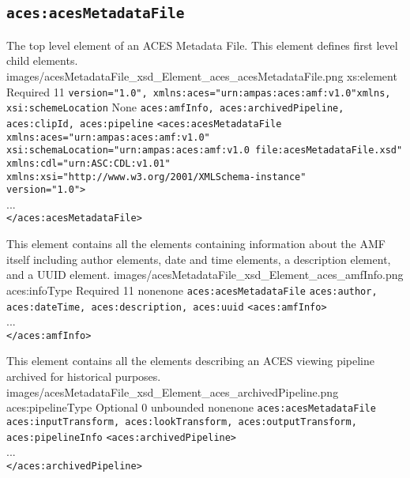 \subsection{\texttt{aces:acesMetadataFile}}

        {The top level element of an ACES Metadata File.  This element defines first level child elements.}
        {images/acesMetadataFile_xsd_Element_aces_acesMetadataFile.png}
        {xs:element}
        {Required}
        {1}{1}
        {\texttt{version="1.0", xmlns:aces="urn:ampas:aces:amf:v1.0"}}{\texttt{xmlns, xsi:schemeLocation}}
        {None}
        {\texttt{aces:amfInfo, aces:archivedPipeline, aces:clipId, aces:pipeline}}
        { \lstinline{<aces:acesMetadataFile} \\
        \lstinline{xmlns:aces="urn:ampas:aces:amf:v1.0"} \\
        \lstinline{xsi:schemaLocation="urn:ampas:aces:amf:v1.0 file:acesMetadataFile.xsd"} \\ \lstinline{xmlns:cdl="urn:ASC:CDL:v1.01"}\\
        \lstinline{xmlns:xsi="http://www.w3.org/2001/XMLSchema-instance"}\\
        \lstinline{version="1.0">}\\
        ... \\
        \lstinline{</aces:acesMetadataFile>}}

        {This element contains all the elements containing information about the AMF itself including author elements, date and time elements, a description element, and a UUID element.}
        {images/acesMetadataFile_xsd_Element_aces_amfInfo.png}
        {aces:infoType}
        {Required}
        {1}{1}
        {none}{none}
        {\texttt{aces:acesMetadataFile}}
        {\texttt{aces:author, aces:dateTime, aces:description, aces:uuid}}
        {\lstinline{<aces:amfInfo>} \\
        ... \\
        \lstinline{</aces:amfInfo>}}

        {This element contains all the elements describing an ACES viewing pipeline archived for historical purposes.}
        {images/acesMetadataFile_xsd_Element_aces_archivedPipeline.png}
        {aces:pipelineType}
        {Optional}
        {0}
        {unbounded}
        {none}{none}
        {\texttt{aces:acesMetadataFile}}
        {\texttt{aces:inputTransform, aces:lookTransform, aces:outputTransform, aces:pipelineInfo}}
        {\lstinline{<aces:archivedPipeline>} \\
        ... \\
        \lstinline{</aces:archivedPipeline>}}

